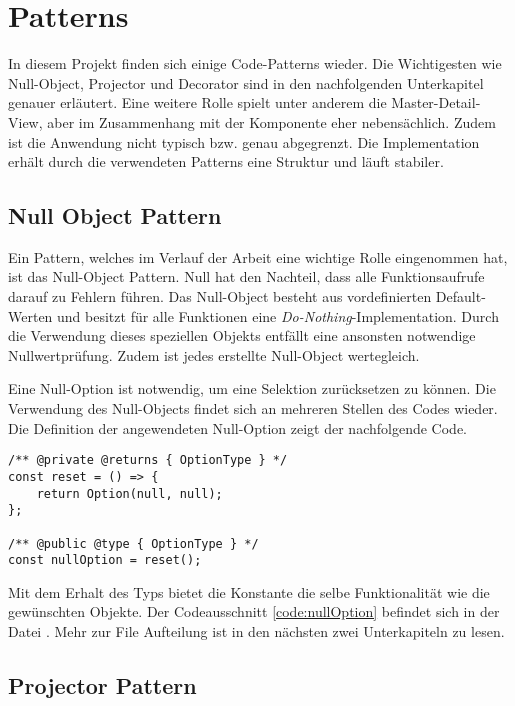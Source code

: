 \section{Patterns}
\label{sec:patterns}

In diesem Projekt finden sich einige Code-Patterns wieder. 
Die Wichtigesten wie Null-Object, Projector und Decorator sind in den nachfolgenden Unterkapitel genauer erläutert. 
Eine weitere Rolle spielt unter anderem die Master-Detail-View, aber im Zusammenhang mit der Komponente eher nebensächlich. 
Zudem ist die Anwendung nicht typisch bzw. genau abgegrenzt. 
Die Implementation erhält durch die verwendeten Patterns eine Struktur und läuft stabiler. 


\subsection{Null Object Pattern}
\label{sec:nullPattern}

Ein Pattern, welches im Verlauf der Arbeit eine wichtige Rolle eingenommen hat, ist das Null-Object Pattern. 
Null hat den Nachteil, dass alle Funktionsaufrufe darauf zu Fehlern führen. 
Das Null-Object besteht aus vordefinierten Default-Werten und besitzt für alle Funktionen eine \emph{Do-Nothing}-Implementation. 
Durch die Verwendung dieses speziellen Objekts entfällt eine ansonsten notwendige Nullwertprüfung. 
Zudem ist jedes erstellte Null-Object wertegleich. 

Eine Null-Option ist notwendig, um eine Selektion zurücksetzen zu können. 
Die Verwendung des Null-Objects findet sich an mehreren Stellen des Codes wieder. 
Die Definition der angewendeten Null-Option zeigt der nachfolgende Code. 

\begin{lstlisting}[style = htmlcssjs, caption = Null-Option Definition, label = code:nullOption]
/** @private @returns { OptionType } */
const reset = () => {
    return Option(null, null);
};

/** @public @type { OptionType } */
const nullOption = reset();
\end{lstlisting}

Mit dem Erhalt des Typs  bietet die Konstante die selbe Funktionalität wie die gewünschten Objekte. 
Der Codeausschnitt \ref{code:nullOption} befindet sich in der Datei . 
Mehr zur File Aufteilung ist in den nächsten zwei Unterkapiteln zu lesen. 


\subsection{Projector Pattern}
\label{sec:projectorPattern}

